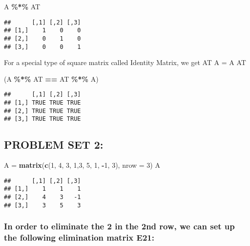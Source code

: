\documentclass[
]{article}
\newenvironment{Shaded}{\begin{snugshade}}{\end{snugshade}}
\newcommand{\AttributeTok}[1]{\textcolor[rgb]{0.13,0.29,0.53}{#1}}
\newcommand{\DecValTok}[1]{\textcolor[rgb]{0.00,0.00,0.81}{#1}}
\newcommand{\FunctionTok}[1]{\textcolor[rgb]{0.13,0.29,0.53}{\textbf{#1}}}
\newcommand{\NormalTok}[1]{#1}
\newcommand{\OtherTok}[1]{\textcolor[rgb]{0.56,0.35,0.01}{#1}}
\newcommand{\SpecialCharTok}[1]{\textcolor[rgb]{0.81,0.36,0.00}{\textbf{#1}}}
\begin{document}
\begin{Shaded}
\begin{Highlighting}[]
\NormalTok{A }\SpecialCharTok{\%*\%}\NormalTok{ AT}
\end{Highlighting}
\end{Shaded}

\begin{verbatim}
##      [,1] [,2] [,3]
## [1,]    1    0    0
## [2,]    0    1    0
## [3,]    0    0    1
\end{verbatim}

For a special type of square matrix called Identity Matrix, we get AT A
= A AT

\begin{Shaded}
\begin{Highlighting}[]
\NormalTok{(A }\SpecialCharTok{\%*\%}\NormalTok{ AT }\SpecialCharTok{==}\NormalTok{ AT }\SpecialCharTok{\%*\%}\NormalTok{ A)}
\end{Highlighting}
\end{Shaded}

\begin{verbatim}
##      [,1] [,2] [,3]
## [1,] TRUE TRUE TRUE
## [2,] TRUE TRUE TRUE
## [3,] TRUE TRUE TRUE
\end{verbatim}

\hypertarget{problem-set-2}{%
\subsection{PROBLEM SET 2:}\label{problem-set-2}}

\begin{Shaded}
\begin{Highlighting}[]
\NormalTok{A }\OtherTok{=} \FunctionTok{matrix}\NormalTok{(}\FunctionTok{c}\NormalTok{(}\DecValTok{1}\NormalTok{, }\DecValTok{4}\NormalTok{, }\DecValTok{3}\NormalTok{, }\DecValTok{1}\NormalTok{,}\DecValTok{3}\NormalTok{, }\DecValTok{5}\NormalTok{, }\DecValTok{1}\NormalTok{, }\SpecialCharTok{{-}}\DecValTok{1}\NormalTok{, }\DecValTok{3}\NormalTok{), }\AttributeTok{nrow =} \DecValTok{3}\NormalTok{)}
\NormalTok{A}
\end{Highlighting}
\end{Shaded}

\begin{verbatim}
##      [,1] [,2] [,3]
## [1,]    1    1    1
## [2,]    4    3   -1
## [3,]    3    5    3
\end{verbatim}

\hypertarget{in-order-to-eliminate-the-2-in-the-2nd-row-we-can-set-up-the-following-elimination-matrix-e21}{%
\subsubsection{In order to eliminate the 2 in the 2nd row, we can set up
the following elimination matrix
E21:}\label{in-order-to-eliminate-the-2-in-the-2nd-row-we-can-set-up-the-following-elimination-matrix-e21}}
\end{document}

